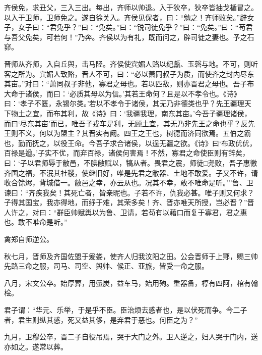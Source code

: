 \documentclass[]{article}
\begin{document}
齐侯免，求丑父，三入三出。每出，齐师以帅退。入于狄卒，狄卒皆抽戈楯冒之。以入于卫师，卫师免之。遂自徐关入。齐侯见保者，曰：``勉之！齐师败矣。''辟女子，女子曰：``君免乎？''曰：``免矣。''曰：``锐司徒免乎？''曰：``免矣。''曰：``苟君与吾父免矣，可若何！''乃奔。齐侯以为有礼，既而问之，辟司徒之妻也。予之石窌。

晋师从齐师，入自丘舆，击马陉。齐侯使宾媚人赂以纪甗、玉磬与地。不可，则听客之所为。宾媚人致赂，晋人不可，曰：``必以萧同叔子为质，而使齐之封内尽东其亩。''对曰：``萧同叔子非他，寡君之母也。若以匹敌，则亦晋君之母也。吾子布大命于诸侯，而曰：`必质其母以为信。'其若王命何？且是以不孝令也。《诗》曰：`孝子不匮，永锡尔类。'若以不孝令于诸侯，其无乃非德类也乎？先王疆理天下物土之宜，而布其利，故《诗》曰：`我疆我理，南东其亩。'今吾子疆理诸侯，而曰`尽东其亩'而已，唯吾子戎车是利，无顾土宜，其无乃非先王之命也乎？反先王则不义，何以为盟主？其晋实有阙。四王之王也，树德而济同欲焉。五伯之霸也，勤而抚之，以役王命。今吾子求合诸侯，以逞无疆之欲。《诗》曰`布政优优，百禄是遒。'子实不优，而弃百禄，诸侯何害焉！不然，寡君之命使臣则有辞矣，曰：`子以君师辱于敝邑，不腆敝赋以，犒从者。畏君之震，师徒□尧败，吾子惠徼齐国之福，不泯其社稷，使继旧好，唯是先君之敝器、土地不敢爱。子又不许，请收合馀烬，背城借一。敝邑之幸，亦云从也。况其不幸，敢不唯命是听。'''鲁、卫谏曰：``齐疾我矣！其死亡者，皆亲昵也。子若不许，仇我必甚。唯子则又何求？子得其国宝，我亦得地，而纾于难，其荣多矣！齐、晋亦唯天所授，岂必晋？''晋人许之，对曰：``群臣帅赋舆以为鲁、卫请，若苟有以藉口而复于寡君，君之惠也。敢不唯命是听。''

禽郑自师逆公。

秋七月，晋师及齐国佐盟于爰娄，使齐人归我汶阳之田。公会晋师于上鄍，赐三帅先路三命之服，司马、司空、舆帅、候正、亚旅，皆受一命之服。

八月，宋文公卒。始厚葬，用蜃炭，益车马，始用殉。重器备，椁有四阿，棺有翰桧。

君子谓：``华元、乐举，于是乎不臣。臣治烦去惑者也，是以伏死而争。今二子者，君生则纵其惑，死又益其侈，是弃君于恶也。何臣之为？''

九月，卫穆公卒，晋二子自役吊焉，哭于大门之外。卫人逆之，妇人哭于门内，送亦如之。遂常以葬。
\end{document}
